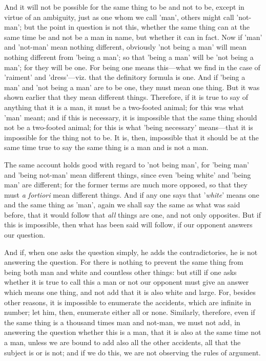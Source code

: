 And it will not be possible for the same thing to be and not to be, except in virtue of an ambiguity, just as one whom we call 'man', others might call 'not-man'; but the point in question is not this, whether the same thing can at the same time be and not be a man in name, but whether it can in fact. Now if 'man' and 'not-man' mean nothing different, obviously 'not being a man' will mean nothing different from 'being a man'; so that 'being a man' will be 'not being a man'; for they will be one. For being one means this—what we find in the case of 'raiment' and 'dress'—viz. that the definitory formula is one. And if 'being a man' and 'not being a man' are to be one, they must mean one thing. But it was shown earlier that they mean different things. Therefore, if it is true to say of anything that it is a man, it must be a two-footed animal; for this was what 'man' meant; and if this is necessary, it is impossible that the same thing should not be a two-footed animal; for this is what 'being necessary' means—that it is impossible for the thing not to be. It is, then, impossible that it should be at the same time true to say the same thing is a man and is not a man.

The same account holds good with regard to 'not being man', for 'being man' and 'being not-man' mean different things, since even 'being white' and 'being man' are different; for the former terms are much more opposed, so that they must \emph{a fortiori} mean different things. And if any one says that '\emph{white}' means one and the same thing as 'man', again we shall say the same as what was said before, that it would follow that \emph{all} things are one, and not only opposites. But if this is impossible, then what has been said will follow, if our opponent answers our question.

And if, when one asks the question simply, he adds the contradictories, he is not answering the question. For there is nothing to prevent the same thing from being both man and white and countless other things: but still if one asks whether it is true to call this a man or not our opponent must give an answer which means one thing, and not add that it is also white and large. For, besides other reasons, it is impossible to enumerate the accidents, which are infinite in number; let him, then, enumerate either all or none. Similarly, therefore, even if the same thing is a thousand times man and not-man, we must not add, in answering the question whether this is a man, that it is also at the same time not a man, unless we are bound to add also all the other accidents, all that the subject is or is not; and if we do this, we are not observing the rules of argument.

